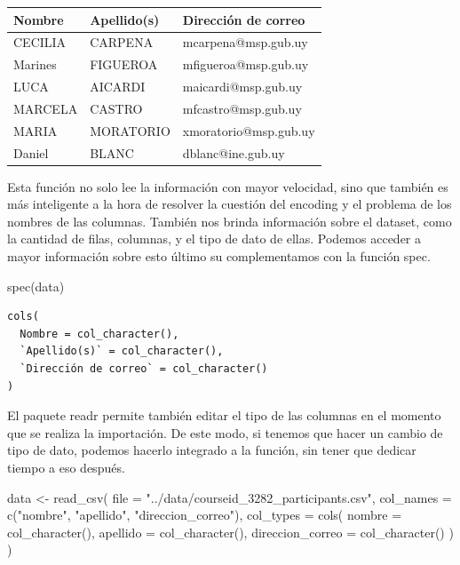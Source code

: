 \documentclass[
  letterpaper,
  DIV=11,
  numbers=noendperiod]{scrreprt}
\newenvironment{Shaded}{\begin{snugshade}}{\end{snugshade}}
\newcommand{\AttributeTok}[1]{\textcolor[rgb]{0.40,0.45,0.13}{#1}}
\newcommand{\FunctionTok}[1]{\textcolor[rgb]{0.28,0.35,0.67}{#1}}
\newcommand{\NormalTok}[1]{\textcolor[rgb]{0.00,0.23,0.31}{#1}}
\newcommand{\OtherTok}[1]{\textcolor[rgb]{0.00,0.23,0.31}{#1}}
\newcommand{\StringTok}[1]{\textcolor[rgb]{0.13,0.47,0.30}{#1}}
\begin{document}
\begin{longtable}[]{@{}lll@{}}
\toprule()
Nombre & Apellido(s) & Dirección de correo \\
\midrule()
\endhead
CECILIA & CARPENA & mcarpena@msp.gub.uy \\
Marines & FIGUEROA & mfigueroa@msp.gub.uy \\
LUCA & AICARDI & maicardi@msp.gub.uy \\
MARCELA & CASTRO & mfcastro@msp.gub.uy \\
MARIA & MORATORIO & xmoratorio@msp.gub.uy \\
Daniel & BLANC & dblanc@ine.gub.uy \\
\bottomrule()
\end{longtable}

Esta función no solo lee la información con mayor velocidad, sino que
también es más inteligente a la hora de resolver la cuestión del
encoding y el problema de los nombres de las columnas. También nos
brinda información sobre el dataset, como la cantidad de filas,
columnas, y el tipo de dato de ellas. Podemos acceder a mayor
información sobre esto último su complementamos con la función spec.

\begin{Shaded}
\begin{Highlighting}[]
\FunctionTok{spec}\NormalTok{(data)}
\end{Highlighting}
\end{Shaded}

\begin{verbatim}
cols(
  Nombre = col_character(),
  `Apellido(s)` = col_character(),
  `Dirección de correo` = col_character()
)
\end{verbatim}

El paquete readr permite también editar el tipo de las columnas en el
momento que se realiza la importación. De este modo, si tenemos que
hacer un cambio de tipo de dato, podemos hacerlo integrado a la función,
sin tener que dedicar tiempo a eso después.

\begin{Shaded}
\begin{Highlighting}[]
\NormalTok{data }\OtherTok{\textless{}{-}} \FunctionTok{read\_csv}\NormalTok{(}
  \AttributeTok{file =} \StringTok{"../data/courseid\_3282\_participants.csv"}\NormalTok{,}
  \AttributeTok{col\_names =} \FunctionTok{c}\NormalTok{(}\StringTok{"nombre"}\NormalTok{, }\StringTok{"apellido"}\NormalTok{, }\StringTok{"direccion\_correo"}\NormalTok{),}
  \AttributeTok{col\_types =} \FunctionTok{cols}\NormalTok{(}
    \AttributeTok{nombre =} \FunctionTok{col\_character}\NormalTok{(),}
    \AttributeTok{apellido =} \FunctionTok{col\_character}\NormalTok{(),}
    \AttributeTok{direccion\_correo =} \FunctionTok{col\_character}\NormalTok{()}
\NormalTok{  )}
\NormalTok{)}
\end{Highlighting}
\end{Shaded}
\end{document}
